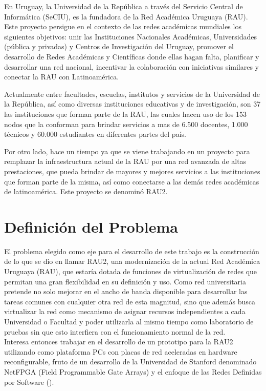 En Uruguay, la Universidad de la República a través del Servicio Central de Informática (SeCIU), es la fundadora de la Red Académica Uruguaya (RAU). Este proyecto persigue en el contexto de las redes académicas mundiales los siguientes objetivos: unir las Instituciones Nacionales Académicas, Universidades (pública y privadas) y Centros de Investigación del Uruguay, promover el desarrollo de Redes Académicas y Científicas donde ellas hagan falta, planificar y desarrollar una red nacional, incentivar la colaboración con iniciativas similares y conectar la RAU con Latinoamérica. 

Actualmente entre facultades, escuelas, institutos y servicios de la Universidad de la República, así como diversas instituciones educativas y de investigación, son 37 las instituciones que forman parte de la RAU, las cuales hacen uso de los 153 nodos que la conforman para brindar servicios a mas de 6.500 docentes, 1.000 técnicos y 60.000 estudiantes en diferentes partes del país.

Por otro lado, hace un tiempo ya que se viene trabajando en un proyecto para remplazar la infraestructura actual de la RAU por una red avanzada de altas prestaciones, que pueda brindar de mayores y mejores servicios a las instituciones que forman parte de la misma, así como conectarse a las demás redes académicas de latinoam\'erica. Este proyecto se denomin\'o RAU2.  

\section{Definición del Problema}

El problema elegido como eje para el desarrollo de este trabajo es la 
construcción de lo que se dio en llamar RAU2, una modernización de la actual Red Académica Uruguaya  
 (RAU), que estaría dotada de funciones de virtualización de redes que permitan una gran flexibilidad en su definición y uso. Como red universitaria pretende no solo mejorar en el ancho de banda disponible para desarrollar las tareas comunes con cualquier otra red de esta magnitud, sino que además busca virtualizar la red como mecanismo de asignar recursos independientes a cada Universidad o Facultad y poder utilizarla al mismo tiempo como laboratorio de pruebas sin que esto interfiera con el funcionamiento normal de la red.\\

Interesa entonces trabajar en el desarrollo de un prototipo para la RAU2 utilizando como plataforma PCs con placas de red aceleradas en hardware reconfigurable, fruto de un desarrollo de la Universidad de Stanford denominado NetFPGA (Field Programmable Gate Arrays)\citep{NetFPGA} y el enfoque de las Redes Definidas por Software ()\citep{gude2008nox}\citep{SDNReadingList}.


